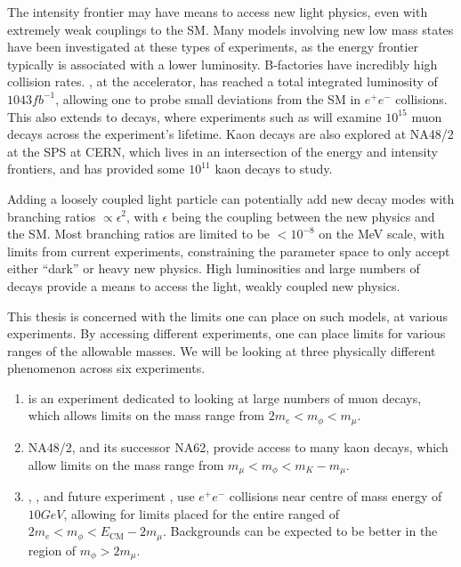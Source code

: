 \label{chapter:experiments}

The intensity frontier may have means to access new light physics, even with extremely weak couplings to the SM.
Many models involving new low mass states have been investigated at these types of experiments, as the energy frontier typically is associated with a lower luminosity.
B-factories have incredibly high collision rates.
\belle, at the \kekb accelerator, has reached a total integrated luminosity of $1043fb^{-1}$, allowing one to probe small deviations from the SM in $e^+ e^-$ collisions.
This also extends to decays, where experiments such as \mueee will examine $10^{15}$ muon decays across the experiment's lifetime.
Kaon decays are also explored at NA48/2 at the SPS at CERN, which lives in an intersection of the energy and intensity frontiers, and has provided some $10^{11}$ kaon decays to study.

Adding a loosely coupled light particle can potentially add new decay modes with branching ratios $\propto \epsilon^2$, with $\epsilon$ being the coupling between the new physics and the SM.
Most branching ratios are limited to be $< 10^{-8}$ on the MeV scale, with limits from current experiments, constraining the parameter space to only accept either ``dark'' or heavy new physics.
High luminosities and large numbers of decays provide a means to access the light, weakly coupled new physics.

This thesis is concerned with the limits one can place on such models, at various experiments.
By accessing different experiments, one can place limits for various ranges of the allowable masses.
We will be looking at three physically different phenomenon across six experiments.
\begin{enumerate}
    \item \mueee is an experiment dedicated to looking at large numbers of muon decays, which allows limits on the mass range from $2 m_e < m_\phi < m_\mu$.
    \item NA48/2, and its successor NA62, provide access to many kaon decays, which allow limits on the mass range from $m_\mu < m_\phi < m_K - m_\mu$.
    \item \babar, \belle, and future experiment \belletwo, use $e^+ e^-$ collisions near centre of mass energy of $10GeV$, allowing for limits placed for the entire ranged of $2m_e < m_\phi < E_\textrm{CM} - 2 m_\mu$. Backgrounds can be expected to be better in the region of $m_\phi > 2 m_\mu$.
\end{enumerate}




